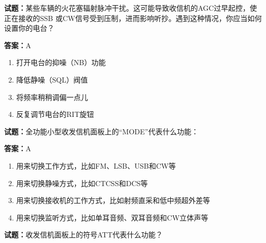 \documentclass{ctexbook}
\begin{document}




\vspace{1em}

\textbf{试题：}某些车辆的火花塞辐射脉冲干扰。这可能导致收信机的AGC过早起控，使正在接收的SSB
或CW信号受到压制，进而影响听抄。遇到这种情况，你应当如何设置你的电台？ 

\textbf{答案：}A 

\begin{enumerate}[leftmargin=3em]
  \item 打开电台的抑噪（NB）功能 

  \item 降低静噪（SQL）阀值 

  \item 将频率稍稍调偏一点儿 

  \item 反复调节电台的RIT旋钮 

\end{enumerate}





\vspace{1em}

\textbf{试题：}全功能小型收发信机面板上的“MODE”代表什么功能： 

\textbf{答案：}A 

\begin{enumerate}[leftmargin=3em]
  \item 用来切换工作方式，比如FM、LSB、USB和CW等 

  \item 用来切换静噪方式，比如CTCSS和DCS等 

  \item 用来切换接收机的工作方式，比如射频直采和低中频超外差等 

  \item 用来切换监听方式，比如单耳音频、双耳音频和CW立体声等 

\end{enumerate}





\vspace{1em}

\textbf{试题：}收发信机面板上的符号ATT代表什么功能？ 
\end{document}

